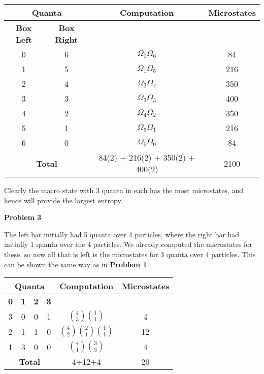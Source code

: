 \documentclass[10pt]{article}
\begin{document}
\begin{center}
\begin{tabular}{|c|c|c|c|}
 \hline
 \multicolumn{2}{|c|}{\textbf{Quanta}} & \textbf{Computation} & \textbf{Microstates}\\
  \hline
  \textbf{Box Left} & \textbf{Box Right} &  &\\
  \hline
  0 & 6 & $\Omega_{0}  \Omega_{6}$ &84\\
  \hline
  1 & 5 & $\Omega_{1}  \Omega_{5}$ &216\\
  \hline
  2 & 4 & $\Omega_{2}  \Omega_{4}$ &350\\  
  \hline
  3 & 3 & $\Omega_{3}  \Omega_{3}$ &400\\
  \hline
  4 & 2 & $\Omega_{4}  \Omega_{2}$ &350\\
  \hline
  5 & 1 & $\Omega_{5}  \Omega_{1}$ &216\\
  \hline
  6 & 0 & $\Omega_{6}  \Omega_{0}$ &84\\
  \hline
  \multicolumn{2}{|c|}{\textbf{Total}} & 84(2) + 216(2) + 350(2) + 400(2) & 2100 \\
  \hline
\end{tabular}
\end{center}

Clearly the macro state with 3 quanta in each has the most microstates, and hence will provide the largest entropy.

\newpage

\textbf{Problem 3}

The left bar initially had 5 quanta over 4 particles, where the right bar had initially 1 quanta over the 4 particles. We already computed the microstates for these, so now all that is left is the microstates for 3 quanta over 4 particles. This can be shown the same way as in \textbf{Problem 1}.

\begin{center}
\begin{tabular}{|c|c|c|c|c|c|}
 \hline
 \multicolumn{4}{|c|}{\textbf{Quanta}} & \textbf{Computation} & \textbf{Microstates}\\
 \hline
 \textbf{0} & \textbf{1} & \textbf{2} & \textbf{3} & & \\
  \hline
  3 & 0 & 0 & 1 & ${{4}\choose{3}}{{1}\choose{1}}$ &4\\
  \hline
  2 & 1 & 1 & 0 & ${{4}\choose{2}}{{2}\choose{1}}{{1}\choose{1}}$ &12\\
  \hline
  1 & 3 & 0 & 0 & ${{4}\choose{1}}{{3}\choose{3}}$ &4\\
  \hline
  \multicolumn{4}{|c|}{\textbf{Total}} & 4+12+4 & 20 \\
  \hline
\end{tabular}
\end{center}
\end{document}
